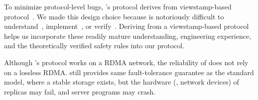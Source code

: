 % 
To minimize protocol-level bugs, \xxx's protocol derives from viewstamp-based 
protocol~\cite{paxos:practical}. We made this design choice because \paxos is 
notoriously difficult to 
understand~\cite{raft:usenix14,paxos:simple,paxos,paxos:complex}, 
implement~\cite{paxos:live,paxos:practical}, or 
verify~\cite{modist:nsdi09,demeter:sosp11}. Deriving from a viewstamp-based 
protocol~\cite{paxos:practical} helps us incorporate these 
readily mature understanding, engineering experience, and the theoretically 
verified safety rules into our protocol.

Although \xxx's \paxos protocol works on a RDMA network, the reliability of 
\xxx does not rely on a lossless RDMA. \xxx still provides same 
fault-tolerance guarantee as the standard \paxos model, where a stable storage 
exists, but the hardware (\eg, network devices) of replicas may fail, and 
server programs may crash.






